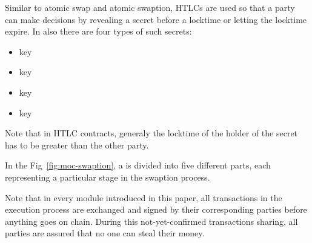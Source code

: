 Similar to atomic swap and atomic swaption, HTLCs are used so that a party can make decisions by revealing a secret before a locktime or letting the locktime expire. In \MetaSwaption also there are four types of such secrets:
\begin{itemize}
    \item \Aone key
    \item \keyone key
    \item \Atwo key
    \item \Delegation key
\end{itemize}

Note that in HTLC contracts, generaly the locktime of the holder of the secret has to be greater than the other party.

In the Fig~\ref{fig:moc-swaption}, a \MetaSwaption is 
divided into five different parts, each representing a particular stage in the swaption process. 

Note that in every module introduced in this paper, all transactions in the execution process are exchanged and signed by their corresponding parties before anything goes on chain. During this not-yet-confirmed transactions sharing, all parties are assured that no one can steal their money.


